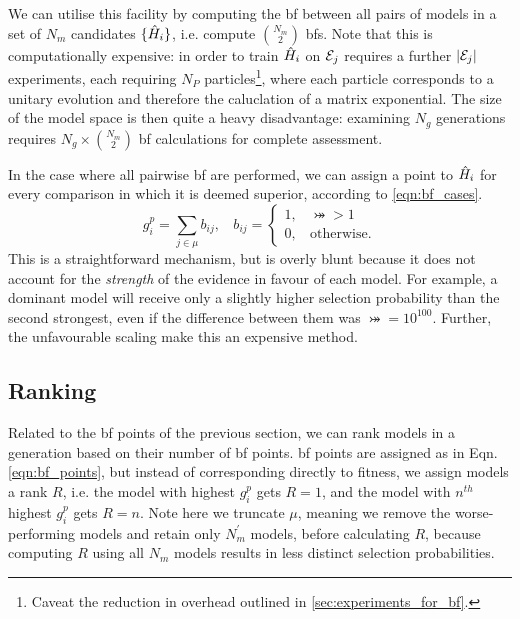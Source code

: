 We can utilise this facility by computing the \gls{bf} between all 
    pairs of models in a set of $N_m$ candidates $\{\hat{H}_i\}$, 
    i.e. compute ${N_m \choose 2}$ \gls{bf}s. 
Note that this is computationally expensive: 
    in order to train $\hat{H}_i$ on ${ \mathcal{E} }_j$ requires a further $\lvert { \mathcal{E} }_j \rvert$ \glspl{experiment}, 
    each requiring $N_P$ \glspl{particle}\footnote{Caveat the reduction in overhead outlined in \cref{sec:experiments_for_bf}.}, 
    where each \gls{particle} corresponds to a unitary evolution and therefore the caluclation of a matrix exponential. 
The size of the \gls{model space} is then quite a heavy disadvantage: 
    examining $N_g$ generations requires $N_g \times {N_m \choose 2}$ \gls{bf} calculations for complete assessment. 
\par 

In the case where all pairwise \gls{bf} are performed, 
    we can assign a point to $\hat{H}_i$ for every comparison in which it is deemed superior, according to \cref{eqn:bf_cases}.
\begin{equation}
    \label{eqn:bf_points}
    g_i^p = \sum_{j \in \mu} b_{ij}, \ \ \ \ b_{ij} = 
        \begin{cases}
            1, \ \ \ \ \bij > 1 \\
            0, \ \ \ \ \text{otherwise}.
        \end{cases}
\end{equation}
This is a straightforward mechanism, but is overly blunt
    because it does not account for the \emph{strength} of the evidence
    in favour of each model. 
For example, a dominant model will receive only a slightly higher selection probability 
    than the second strongest, even if the difference between them was $\bij = 10^{100}$. 
Further, the unfavourable scaling make this an expensive method. 

\subsection{Ranking}\label{sec:bf_ranking}
Related to the \gls{bf} points of the previous section, we can rank models in a generation based on their number of \gls{bf} points.
\gls{bf} points are assigned as in Eqn. \ref{eqn:bf_points}, 
    but instead of corresponding directly to fitness, 
    we assign models a rank $R$, 
    i.e. the model with highest $g_i^p$ gets $R=1$, 
    and the model with $n^{th}$ highest $g_i^p$ gets $R=n$. 
Note here we truncate $\mu$, meaning we remove the worse-performing models and retain only $N_m^{\prime}$ models, 
    before calculating $R$, because computing $R$ using all $N_m$ models results in less distinct selection probabilities. 

